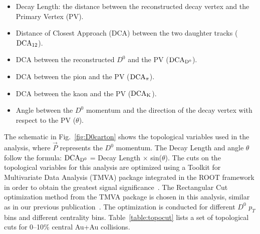 \documentclass[%
 reprint,	
 amsmath,amssymb,
 aps,
 prc,
]{revtex4-1}
\begin{document}
\begin{itemize}
  \item Decay Length: the distance between the reconstructed decay vertex and the Primary Vertex (PV).
  \item Distance of Closest Approach (DCA) between the two daughter tracks ($\rm{DCA_{12}}$).
  \item DCA between the reconstructed $D^0$ and the PV ($\rm{DCA_{D^{0}}}$).
  \item DCA between the pion and the PV ($\rm{DCA_{\pi}}$).
  \item DCA between the kaon and the PV ($\rm{DCA_{K}}$).
  \item Angle between the $D^0$ momentum and the direction of the decay vertex with respect to the PV ($\theta$).
\end{itemize}

The schematic in Fig.~\ref{fig:D0carton} shows the topological variables used in the analysis, where $\vec{P}$ represents the $D^0$ momentum. The Decay Length and angle $\theta$ follow the formula: $\rm DCA_{D^{0}}$ = Decay Length $\times$ sin($\theta$). The cuts on the topological variables for this analysis are optimized using a Toolkit for Multivariate Data Analysis (TMVA) package integrated in the ROOT framework in order to obtain the greatest signal significance~\cite{TMVA}. The Rectangular Cut optimization method from the TMVA package is chosen in this analysis, similar as in our previous publication~\cite{Star_D_v2}. The optimization is conducted for different $D^0$ $p_{T}$ bins and different centrality bins. Table~\ref{table:topocut} lists a set of topological cuts for 0--10\% central Au+Au collisions.
\end{document}
